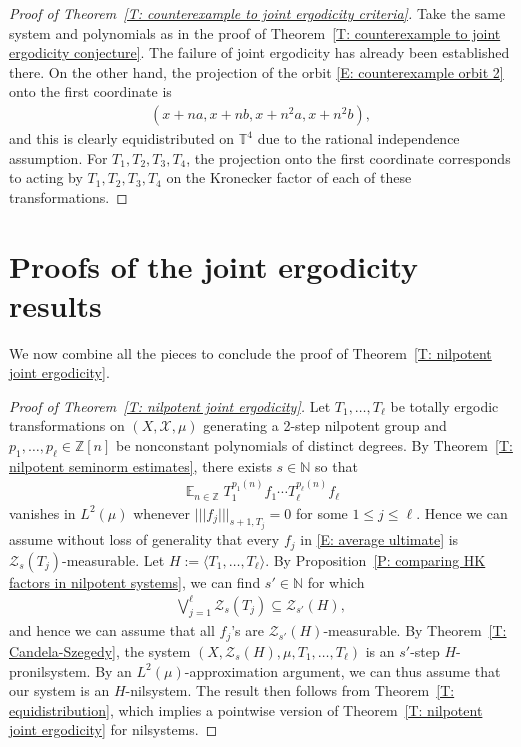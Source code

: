 \documentclass[11pt]{amsart}
\theoremstyle{definition}
\DeclareMathOperator*{\E}{\mathbb{E}}
\newcommand{\N}{{\mathbb N}}
\newcommand{\T}{{\mathbb T}}
\newcommand{\Z}{{\mathbb Z}}
\newcommand{\CX}{{\mathcal X}}
\newcommand{\CZ}{{\mathcal Z}}
\newcommand{\nnorm}[1]{\lvert\!|\!| #1|\!|\!\rvert}
\newcommand{\1}{{\mathbf{1}}}
\begin{document}
\begin{proof}[Proof of Theorem~\ref{T: counterexample to joint ergodicity criteria}]
    Take the same system and polynomials as in the proof of Theorem~\ref{T: counterexample to joint ergodicity conjecture}. The failure of joint ergodicity has already been established there. On the other hand, the projection of the orbit \eqref{E: counterexample orbit 2} onto the first coordinate is 
\begin{align*}
    (x+na, x+nb, x+n^{2}a, x+n^{2}b),
\end{align*}
and this is clearly equidistributed on $\T^4$ due to the rational independence assumption. For $T_1, T_2, T_3, T_4$, the projection onto the first coordinate corresponds to acting by $T_1, T_2, T_3, T_4$ on the Kronecker factor of each of these transformations.
\end{proof}

\section{Proofs of the joint ergodicity results}\label{S: proofs of main results}
We now combine all the pieces to conclude the proof of Theorem~\ref{T: nilpotent joint ergodicity}.
\begin{proof}[Proof of Theorem~\ref{T: nilpotent joint ergodicity}]
Let $T_1, \ldots, T_\ell$ be totally ergodic transformations on $(X, \CX, \mu)$ generating a 2-step nilpotent group and $p_1, \ldots, p_\ell\in\Z[n]$ be nonconstant polynomials of distinct degrees. By Theorem~\ref{T: nilpotent seminorm estimates}, there exists $s\in\N$ so that 
  \begin{align}\label{E: average ultimate}
    \E_{n\in\Z}T_1^{p_1(n)}f_1\cdots T_\ell^{p_\ell(n)}f_\ell
\end{align}
vanishes in $L^2(\mu)$
whenever $\nnorm{f_j}_{s+1,T_j} = 0$ for some $1\leq j\leq \ell$. Hence we can assume without loss of generality that every $f_j$ in \eqref{E: average ultimate} is $\CZ_s(T_j)$-measurable. Let $H := \langle T_1, \ldots, T_\ell\rangle$. By Proposition~\ref{P: comparing HK factors in nilpotent systems}, we can find $s'\in\N$ for which
\begin{align*}
    \bigvee_{j=1}^\ell \CZ_s(T_j)\subseteq \CZ_{s'}(H),
\end{align*}
and hence we can assume that all $f_j$'s are $\CZ_{s'}(H)$-measurable. By Theorem~\ref{T: Candela-Szegedy}, the system $(X, \CZ_s(H), \mu, T_1, \ldots, T_\ell)$ is an $s'$-step $H$-pronilsystem. By an $L^2(\mu)$-approximation argument, we can thus assume that our system is an $H$-nilsystem. The result then follows from Theorem~\ref{T: equidistribution}, which implies a pointwise version of Theorem~\ref{T: nilpotent joint ergodicity} for nilsystems. 
\end{proof}
\end{document}
